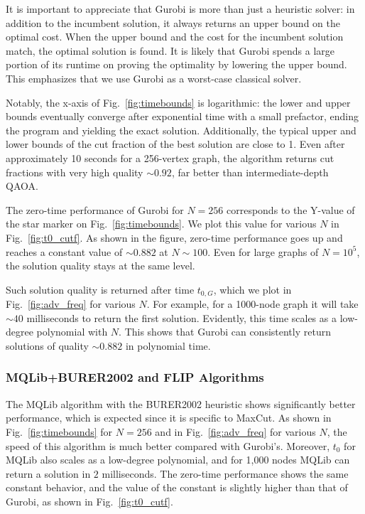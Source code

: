 It is important to appreciate that Gurobi is more than just a heuristic solver: in addition to the incumbent solution, it always returns an upper bound on the optimal cost. 
When the upper bound and the cost for the incumbent solution match, the optimal solution is found.
It is likely that Gurobi spends a large portion of its runtime on proving the optimality by lowering the upper bound. This emphasizes that we use Gurobi as a worst-case classical solver.


Notably, the x-axis of Fig.~\ref{fig:timebounds} is logarithmic: the lower and upper bounds eventually converge after exponential time with a small prefactor, ending the program and yielding the exact solution. Additionally, the typical upper and lower bounds of the cut fraction of the best solution are close to 1. Even after approximately 10 seconds for a 256-vertex graph, the algorithm returns cut fractions with very high quality $\sim 0.92$, far better than intermediate-depth QAOA.

The zero-time performance of Gurobi for $N = 256$ corresponds to the Y-value of the star marker on Fig.~\ref{fig:timebounds}. We plot this value for various $N$ in Fig.~\ref{fig:t0_cutf}. As shown in the figure, zero-time performance goes up and reaches a constant value of $\sim 0.882$ at $N \sim 100$. Even for large graphs of $N = 10^5$, the solution quality stays at the same level.

Such solution quality is returned after time $t_{0,G}$, which we plot in Fig.~\ref{fig:adv_freq} for various $N$. For example, for a 1000-node graph it will take $\sim 40$ milliseconds to return the first solution. Evidently, this time scales as a low-degree polynomial with $N$. This shows that Gurobi can consistently return solutions of quality $\sim 0.882$ in polynomial time.


\subsubsection{MQLib+BURER2002 and FLIP Algorithms}

The MQLib algorithm with the BURER2002 heuristic shows significantly better performance, which is expected since it is specific to MaxCut.
As shown in Fig.~\ref{fig:timebounds} for $N=256$ and in Fig.~\ref{fig:adv_freq} for various $N$, the speed of this algorithm is much better compared with Gurobi's. Moreover, 
$t_0$ for MQLib also scales as a low-degree polynomial, and for 1,000 nodes MQLib can return a solution in $2$ milliseconds.
The zero-time performance shows the same constant behavior, and the value of the constant is slightly higher than that of Gurobi, as shown in Fig.~\ref{fig:t0_cutf}.

